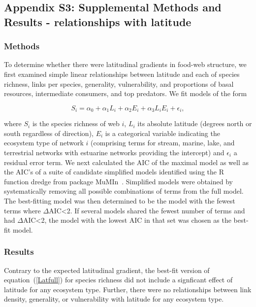 \documentclass[12pt]{article}
\begin{document}
\subsection*{Appendix S3: Supplemental Methods and Results - relationships with latitude}

  \subsubsection*{Methods}

    To determine whether there were latitudinal gradients in food-web structure,
    we first examined simple linear relationships between latitude and each of 
    species richness, links per species, generality, vulnerability, and proportions
    of basal resources, intermediate consumers, and top predators. We fit models of the form

    \begin{equation}
    \label{Latfull}
    S_{i} = \alpha_{0} + \alpha_{1} L_{i} + \alpha_{2} E_{i} + \alpha_{3} L_{i} E_{i} + \epsilon_{i} ,
    \end{equation}

    \noindent where $S_{i}$ is the species richness of web $i$, $L_{i}$ its absolute
    latitude (degrees north or south  regardless of direction), $E_{i}$ is a categorical
    variable indicating the ecosystem type of network $i$ (comprising terms for stream, 
    marine, lake, and terrestrial networks with estuarine
    networks providing the intercept) and $\epsilon_{i}$ a residual error term. 
    We next calculated the AIC
    of the maximal model as well as the AIC's of a suite of candidate simplified models identified
    using the R~\citep{R} function dredge from package MuMIn~\citep{MuMIn}. 
    Simplified models were obtained by
    systematically removing all possible combinations of terms from the full model.
    The best-fitting model was then determined to be the model with the fewest terms 
    where $\Delta$AIC\textless2. If several models shared the fewest number of terms 
    and had $\Delta$AIC\textless2, the model with the lowest AIC in that set was chosen as the best-fit
    model.


  \subsubsection*{Results}
    Contrary to the expected latitudinal gradient, the best-fit version of
    equation~(\ref{Latfull}) for species richness did not 
    include a signficant effect of latitude for any 
    ecosystem type. Further, there were no relationships
    between link density, generality, or vulnerability
    with latitude for any ecosystem type.
\end{document}
